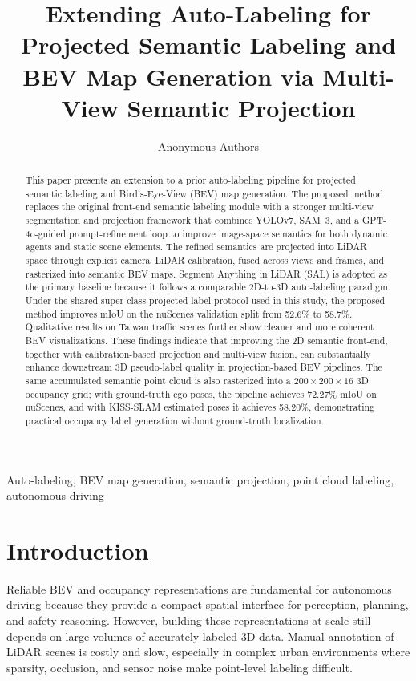\documentclass[conference]{IEEEtran}
\title{Extending Auto-Labeling for Projected Semantic Labeling and BEV Map Generation via Multi-View Semantic Projection}
\author{Anonymous Authors}
\begin{document}
\maketitle

\begin{abstract}
This paper presents an extension to a prior auto-labeling pipeline for projected semantic labeling and Bird's-Eye-View (BEV) map generation. The proposed method replaces the original front-end semantic labeling module with a stronger multi-view segmentation and projection framework that combines YOLOv7, SAM~3, and a GPT-4o-guided prompt-refinement loop to improve image-space semantics for both dynamic agents and static scene elements. The refined semantics are projected into LiDAR space through explicit camera--LiDAR calibration, fused across views and frames, and rasterized into semantic BEV maps. Segment Anything in LiDAR (SAL) is adopted as the primary baseline because it follows a comparable 2D-to-3D auto-labeling paradigm. Under the shared super-class projected-label protocol used in this study, the proposed method improves mIoU on the nuScenes validation split from 52.6\% to 58.7\%. Qualitative results on Taiwan traffic scenes further show cleaner and more coherent BEV visualizations. These findings indicate that improving the 2D semantic front-end, together with calibration-based projection and multi-view fusion, can substantially enhance downstream 3D pseudo-label quality in projection-based BEV pipelines. The same accumulated semantic point cloud is also rasterized into a $200\times200\times16$ 3D occupancy grid; with ground-truth ego poses, the pipeline achieves 72.27\% mIoU on nuScenes, and with KISS-SLAM estimated poses it achieves 58.20\%, demonstrating practical occupancy label generation without ground-truth localization.
\end{abstract}

\begin{IEEEkeywords}
Auto-labeling, BEV map generation, semantic projection, point cloud labeling, autonomous driving
\end{IEEEkeywords}

\section{Introduction}
Reliable BEV and occupancy representations are fundamental for autonomous driving because they provide a compact spatial interface for perception, planning, and safety reasoning. However, building these representations at scale still depends on large volumes of accurately labeled 3D data. Manual annotation of LiDAR scenes is costly and slow, especially in complex urban environments where sparsity, occlusion, and sensor noise make point-level labeling difficult.
\end{document}

